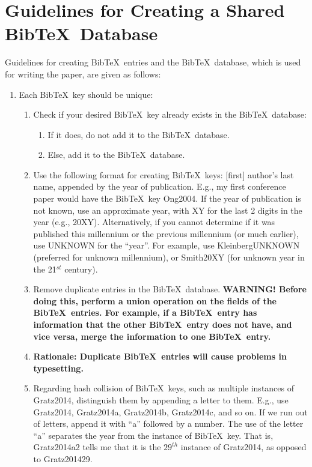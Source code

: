 \documentclass[letter,12pt]{article}
\begin{document}
\section{Guidelines for Creating a Shared {\sc Bib}\TeX\ Database}
\label{sec:GuidelinesforCreatingaSharedBibTeXDatabase}

Guidelines for creating {\sc Bib}\TeX\ entries and the {\sc Bib}\TeX\ database, which is used for writing the paper, are given as follows: \vspace{-0.2cm}
\begin{enumerate} \itemsep -2pt
\item Each {\sc Bib}\TeX\ key should be unique: \vspace{-0.3cm}
	\begin{enumerate} \itemsep -2pt
	\item Check if your desired {\sc Bib}\TeX\ key already exists in the {\sc Bib}\TeX\ database: \vspace{-0.1cm}
		\begin{enumerate} %
		\item If it does, do not add it to the  {\sc Bib}\TeX\ database.
		\item Else, add it to the  {\sc Bib}\TeX\ database.
		\end{enumerate}
	\item Use the following format for creating {\sc Bib}\TeX\ keys: [first] author's last name, appended by the year of publication. E.g., my first conference paper would have the {\sc Bib}\TeX\ key Ong2004. If the year of publication is not known, use an approximate year, with XY for the last 2 digits in the year (e.g., 20XY). Alternatively, if you cannot determine if it was published this millennium or the previous millennium (or much earlier), use UNKNOWN for the ``year''. For example, use KleinbergUNKNOWN (preferred for unknown millennium), or Smith20XY (for unknown year in the 21$^{st}$ century).
	\item Remove duplicate entries in the {\sc Bib}\TeX\ database. {\bf WARNING! Before doing this, perform a union operation on the fields of the {\sc Bib}\TeX\ entries. For example, if a {\sc Bib}\TeX\ entry has information that the other {\sc Bib}\TeX\ entry does not have, and vice versa, merge the information to one {\sc Bib}\TeX\ entry.}
	\item {\bf Rationale: Duplicate {\sc Bib}\TeX\ entries will cause problems in typesetting.}
	\item Regarding hash collision of {\sc Bib}\TeX\ keys, such as multiple instances of Gratz2014, distinguish them by appending a letter to them. E.g., use Gratz2014, Gratz2014a, Gratz2014b, Gratz2014c, and so on. If we run out of letters, append it with ``a'' followed by a number. The use of the letter ``a'' separates the year from the instance of {\sc Bib}\TeX\ key. That is, Gratz2014a2 tells me that it is the $29^{th}$ instance of Gratz2014, as opposed to Gratz201429.

\end{enumerate}
\end{enumerate}
\end{document}
